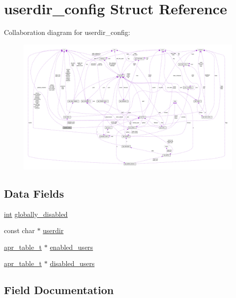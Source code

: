 \hypertarget{structuserdir__config}{}\section{userdir\+\_\+config Struct Reference}
\label{structuserdir__config}


Collaboration diagram for userdir\+\_\+config\+:
\nopagebreak
\begin{figure}[H]
\begin{center}
\leavevmode
\includegraphics[width=350pt]{structuserdir__config__coll__graph}
\end{center}
\end{figure}
\subsection*{Data Fields}
\begin{DoxyCompactItemize}
\item 
\hyperlink{pcre_8txt_a42dfa4ff673c82d8efe7144098fbc198}{int} \hyperlink{structuserdir__config_afdc5e764caf281faf28125f0148739f7}{globally\+\_\+disabled}
\item 
const char $\ast$ \hyperlink{structuserdir__config_a6e9209489d54f27d6f914fbd0a5f5d49}{userdir}
\item 
\hyperlink{structapr__table__t}{apr\+\_\+table\+\_\+t} $\ast$ \hyperlink{structuserdir__config_a0a18b2733800809a369f04370ee926fd}{enabled\+\_\+users}
\item 
\hyperlink{structapr__table__t}{apr\+\_\+table\+\_\+t} $\ast$ \hyperlink{structuserdir__config_a0cc37ae8df7448251b6ef49d9a07fa97}{disabled\+\_\+users}
\end{DoxyCompactItemize}


\subsection{Field Documentation}
